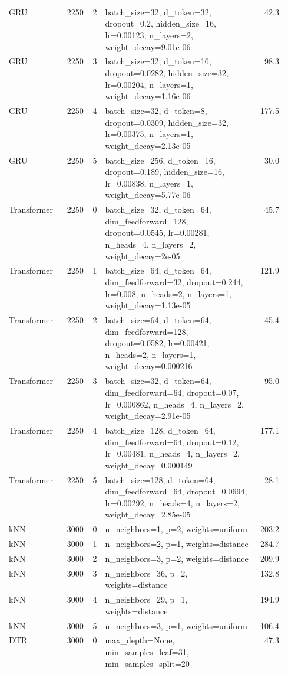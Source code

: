 \begin{longtable}{lrrp{0.55\linewidth}r}
GRU & 2250 & 2 & batch\_size=32, d\_token=32, dropout=0.2, hidden\_size=16, lr=0.00123, n\_layers=2, weight\_decay=9.01e-06 & 42.3 \\
GRU & 2250 & 3 & batch\_size=32, d\_token=16, dropout=0.0282, hidden\_size=32, lr=0.00204, n\_layers=1, weight\_decay=1.16e-06 & 98.3 \\
GRU & 2250 & 4 & batch\_size=32, d\_token=8, dropout=0.0309, hidden\_size=32, lr=0.00375, n\_layers=1, weight\_decay=2.13e-05 & 177.5 \\
GRU & 2250 & 5 & batch\_size=256, d\_token=16, dropout=0.189, hidden\_size=16, lr=0.00838, n\_layers=1, weight\_decay=5.77e-06 & 30.0 \\
Transformer & 2250 & 0 & batch\_size=32, d\_token=64, dim\_feedforward=128, dropout=0.0545, lr=0.00281, n\_heads=4, n\_layers=2, weight\_decay=2e-05 & 45.7 \\
Transformer & 2250 & 1 & batch\_size=64, d\_token=64, dim\_feedforward=32, dropout=0.244, lr=0.008, n\_heads=2, n\_layers=1, weight\_decay=1.13e-05 & 121.9 \\
Transformer & 2250 & 2 & batch\_size=64, d\_token=64, dim\_feedforward=128, dropout=0.0582, lr=0.00421, n\_heads=2, n\_layers=1, weight\_decay=0.000216 & 45.4 \\
Transformer & 2250 & 3 & batch\_size=32, d\_token=64, dim\_feedforward=64, dropout=0.07, lr=0.000862, n\_heads=4, n\_layers=2, weight\_decay=2.91e-05 & 95.0 \\
Transformer & 2250 & 4 & batch\_size=128, d\_token=64, dim\_feedforward=64, dropout=0.12, lr=0.00481, n\_heads=4, n\_layers=2, weight\_decay=0.000149 & 177.1 \\
Transformer & 2250 & 5 & batch\_size=128, d\_token=64, dim\_feedforward=64, dropout=0.0694, lr=0.00292, n\_heads=4, n\_layers=2, weight\_decay=2.85e-05 & 28.1 \\
\midrule
kNN & 3000 & 0 & n\_neighbors=1, p=2, weights=uniform & 203.2 \\
kNN & 3000 & 1 & n\_neighbors=2, p=1, weights=distance & 284.7 \\
kNN & 3000 & 2 & n\_neighbors=3, p=2, weights=distance & 209.9 \\
kNN & 3000 & 3 & n\_neighbors=36, p=2, weights=distance & 132.8 \\
kNN & 3000 & 4 & n\_neighbors=29, p=1, weights=distance & 194.9 \\
kNN & 3000 & 5 & n\_neighbors=3, p=1, weights=uniform & 106.4 \\
DTR & 3000 & 0 & max\_depth=None, min\_samples\_leaf=31, min\_samples\_split=20 & 47.3 \\

\end{longtable}
